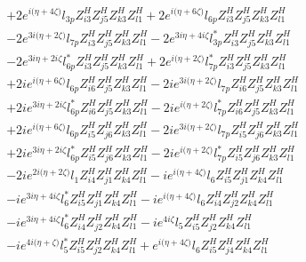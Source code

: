 \begin{align}
 &+2 e^{i \Big(\eta +4 \zeta \Big)} l_{3p} Z_{{i 3}}^{H} Z_{{j 5}}^{H} Z_{{k 3}}^{H} Z_{{l 1}}^{H} +2 e^{i \Big(\eta +6 \zeta \Big)} l_{6p} Z_{{i 3}}^{H} Z_{{j 5}}^{H} Z_{{k 3}}^{H} Z_{{l 1}}^{H} \nonumber \\ 
 &-2 e^{3 i \Big(\eta +2 \zeta \Big)} l_{7p} Z_{{i 3}}^{H} Z_{{j 5}}^{H} Z_{{k 3}}^{H} Z_{{l 1}}^{H} -2 e^{3 i \eta +4 i \zeta } l_{3p}^* Z_{{i 3}}^{H} Z_{{j 5}}^{H} Z_{{k 3}}^{H} Z_{{l 1}}^{H} \nonumber \\ 
 &-2 e^{3 i \eta +2 i \zeta } l_{6p}^* Z_{{i 3}}^{H} Z_{{j 5}}^{H} Z_{{k 3}}^{H} Z_{{l 1}}^{H} +2 e^{i \Big(\eta +2 \zeta \Big)} l_{7p}^* Z_{{i 3}}^{H} Z_{{j 5}}^{H} Z_{{k 3}}^{H} Z_{{l 1}}^{H} \nonumber \\ 
 &+2 i e^{i \Big(\eta +6 \zeta \Big)} l_{6p} Z_{{i 6}}^{H} Z_{{j 5}}^{H} Z_{{k 3}}^{H} Z_{{l 1}}^{H} -2 i e^{3 i \Big(\eta +2 \zeta \Big)} l_{7p} Z_{{i 6}}^{H} Z_{{j 5}}^{H} Z_{{k 3}}^{H} Z_{{l 1}}^{H} \nonumber \\ 
 &+2 i e^{3 i \eta +2 i \zeta } l_{6p}^* Z_{{i 6}}^{H} Z_{{j 5}}^{H} Z_{{k 3}}^{H} Z_{{l 1}}^{H} -2 i e^{i \Big(\eta +2 \zeta \Big)} l_{7p}^* Z_{{i 6}}^{H} Z_{{j 5}}^{H} Z_{{k 3}}^{H} Z_{{l 1}}^{H} \nonumber \\ 
 &+2 i e^{i \Big(\eta +6 \zeta \Big)} l_{6p} Z_{{i 5}}^{H} Z_{{j 6}}^{H} Z_{{k 3}}^{H} Z_{{l 1}}^{H} -2 i e^{3 i \Big(\eta +2 \zeta \Big)} l_{7p} Z_{{i 5}}^{H} Z_{{j 6}}^{H} Z_{{k 3}}^{H} Z_{{l 1}}^{H} \nonumber \\ 
 &+2 i e^{3 i \eta +2 i \zeta } l_{6p}^* Z_{{i 5}}^{H} Z_{{j 6}}^{H} Z_{{k 3}}^{H} Z_{{l 1}}^{H} -2 i e^{i \Big(\eta +2 \zeta \Big)} l_{7p}^* Z_{{i 5}}^{H} Z_{{j 6}}^{H} Z_{{k 3}}^{H} Z_{{l 1}}^{H} \nonumber \\ 
 &-2 i e^{2 i \Big(\eta +2 \zeta \Big)} l_1 Z_{{i 4}}^{H} Z_{{j 1}}^{H} Z_{{k 4}}^{H} Z_{{l 1}}^{H} -i e^{i \Big(\eta +4 \zeta \Big)} l_6 Z_{{i 5}}^{H} Z_{{j 1}}^{H} Z_{{k 4}}^{H} Z_{{l 1}}^{H} \nonumber \\ 
 &-i e^{3 i \eta +4 i \zeta } l_6^* Z_{{i 5}}^{H} Z_{{j 1}}^{H} Z_{{k 4}}^{H} Z_{{l 1}}^{H} -i e^{i \Big(\eta +4 \zeta \Big)} l_6 Z_{{i 4}}^{H} Z_{{j 2}}^{H} Z_{{k 4}}^{H} Z_{{l 1}}^{H} \nonumber \\ 
 &-i e^{3 i \eta +4 i \zeta } l_6^* Z_{{i 4}}^{H} Z_{{j 2}}^{H} Z_{{k 4}}^{H} Z_{{l 1}}^{H} -i e^{4 i \zeta } l_5 Z_{{i 5}}^{H} Z_{{j 2}}^{H} Z_{{k 4}}^{H} Z_{{l 1}}^{H} \nonumber \\ 
 &-i e^{4 i \Big(\eta +\zeta \Big)} l_5^* Z_{{i 5}}^{H} Z_{{j 2}}^{H} Z_{{k 4}}^{H} Z_{{l 1}}^{H} +e^{i \Big(\eta +4 \zeta \Big)} l_6 Z_{{i 5}}^{H} Z_{{j 4}}^{H} Z_{{k 4}}^{H} Z_{{l 1}}^{H} \nonumber \\ 

\end{align}
